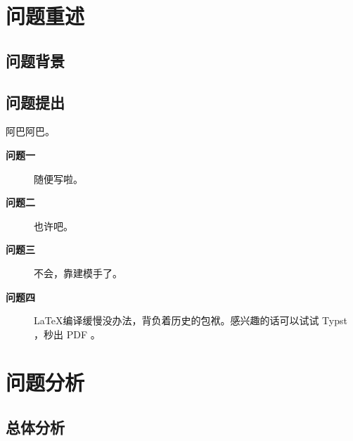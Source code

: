 \documentclass{MMCStyle}
\begin{document}

\begin{abstract}

摘要开始。

\textbf{针对问题一：}\lipsum[1]

\textbf{针对问题二：}\zhlipsum[2]

\textbf{针对问题三：}为什么还要写摘要。

我不想写摘要，摘要要认真写。%
\end{abstract}



\tableofcontents\newpage
\clearpage
{}
\pagestyle{fancy}



\section{问题重述}

\subsection{问题背景}

\zhlipsum[4]

\subsection{问题提出}%

阿巴阿巴。

\begin{description}
  \item[\bfseries 问题一]随便写啦。
  \item[\bfseries 问题二]也许吧。
  \item[\bfseries 问题三]不会，靠建模手了。
  \item[\bfseries 问题四]\LaTeX{}编译缓慢没办法，背负着历史的包袱。感兴趣的话可以试试 Typst ，秒出 PDF 。
\end{description}

\section{问题分析}

\subsection{总体分析}
\end{document}
